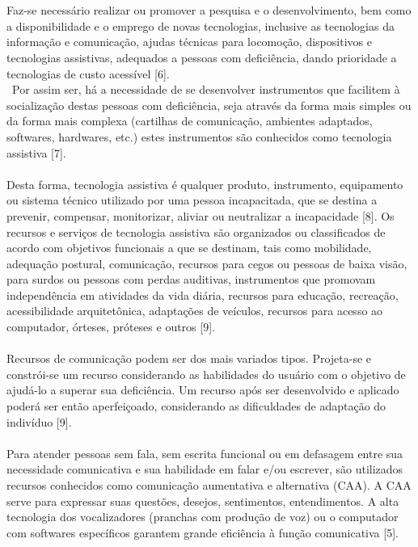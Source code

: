 \documentclass[twoside]{article}
\begin{document}
\begin{multicols}{2}
\\\\
Faz-se necessário realizar ou promover a pesquisa e o desenvolvimento, bem como a disponibilidade e o emprego de novas tecnologias, inclusive as tecnologias da informação e comunicação, ajudas técnicas para locomoção, dispositivos e tecnologias assistivas, adequados a pessoas com deficiência, dando prioridade a tecnologias de custo acessível [6].
\\\
Por assim ser, há a necessidade de se desenvolver instrumentos que facilitem à socialização destas pessoas com deficiência, seja através da forma mais simples ou da forma mais complexa (cartilhas de comunicação, ambientes adaptados, softwares, hardwares, etc.) estes instrumentos são conhecidos como tecnologia assistiva [7].
\\\\
Desta forma, tecnologia assistiva é qualquer produto, instrumento, equipamento ou sistema técnico utilizado por uma pessoa incapacitada, que se destina a prevenir, compensar, monitorizar, aliviar ou neutralizar a incapacidade [8].
Os recursos e serviços de tecnologia assistiva são organizados ou classificados de acordo com objetivos funcionais a que se destinam, tais como mobilidade, adequação postural, comunicação, recursos para cegos ou pessoas de baixa visão, para surdos ou pessoas com perdas auditivas, instrumentos que promovam independência em atividades da vida diária, recursos para educação, recreação, acessibilidade arquitetônica, adaptações de veículos, recursos para acesso ao computador, órteses, próteses e outros [9].
\\\\
Recursos de comunicação podem ser dos mais variados tipos. Projeta-se e constrói-se um recurso considerando as habilidades do usuário com o objetivo de ajudá-lo a superar sua deficiência. Um recurso após ser desenvolvido e aplicado poderá ser então aperfeiçoado, considerando as dificuldades de adaptação do indivíduo [9]. 
\\\\
Para atender pessoas sem fala, sem escrita funcional ou em defasagem entre sua necessidade comunicativa e sua habilidade em falar e/ou escrever, são utilizados recursos conhecidos como comunicação aumentativa e alternativa (CAA). A CAA serve para expressar suas questões, desejos, sentimentos, entendimentos. A alta tecnologia dos vocalizadores (pranchas com produção de voz) ou o computador com softwares específicos garantem grande eficiência à função comunicativa [5].


\end{multicols}
\end{document}
